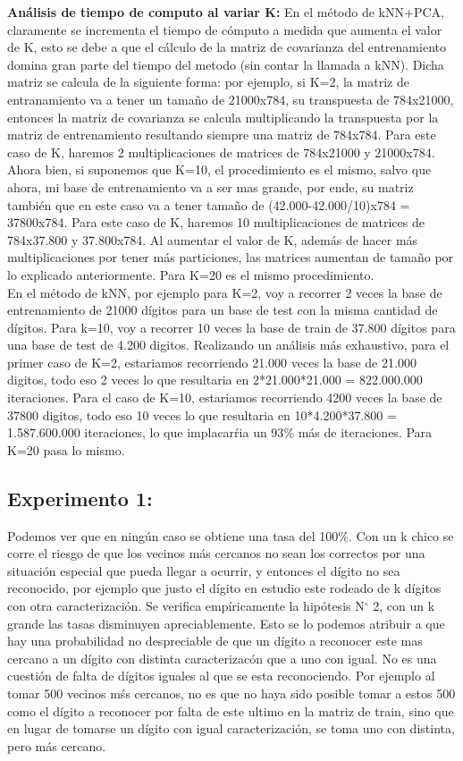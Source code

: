 \textbf{Análisis de tiempo de computo al variar K:}
 En el método de kNN+PCA, claramente se incrementa el tiempo de cómputo a medida que aumenta el valor de K, esto se debe a que el cálculo de la matriz de covarianza del entrenamiento domina gran parte del tiempo del metodo (sin contar la llamada a kNN). Dicha matriz se calcula de la siguiente forma: por ejemplo, si K=2, la matriz de entranamiento va a tener un tamaño de 21000x784, su transpuesta de 784x21000, entonces la matriz de covarianza se calcula multiplicando la transpuesta por la matriz de entrenamiento resultando siempre una matriz de 784x784. Para este caso de K, haremos 2 multiplicaciones de matrices de 784x21000 y 21000x784. Ahora bien, si suponemos que K=10, el procedimiento es el mismo, salvo que ahora, mi base de entrenamiento va a ser mas grande, por ende, su matriz también que en este caso va a tener tamaño de (42.000-42.000/10)x784 = 37800x784. Para este caso de K, haremos 10 multiplicaciones de matrices de 784x37.800 y 37.800x784. Al aumentar el valor de K, además de hacer más multiplicaciones por tener más particiones, las matrices aumentan de tamaño por lo explicado anteriormente. Para K=20 es el mismo procedimiento.\\
En el método de kNN, por ejemplo para K=2, voy a recorrer 2 veces la base de entrenamiento de 21000 dígitos para un base de test con la misma cantidad de dígitos. Para k=10, voy a recorrer 10 veces la base de train de 37.800 dígitos para una base de test de 4.200 digitos. Realizando un análisis más exhaustivo, para el primer caso de K=2, estariamos recorriendo 21.000 veces la base de 21.000 digitos, todo eso 2 veces lo que resultaria en 2*21.000*21.000 = 822.000.000 iteraciones. Para el caso de K=10, estariamos recorriendo 4200 veces la base de 37800 digitos, todo eso 10 veces lo que resultaria en 10*4.200*37.800 = 1.587.600.000 iteraciones, lo que implacarŕia un 93$\%$ más de iteraciones. Para K=20 pasa lo mismo.\\

 \subsection{Experimento 1:}

Podemos ver que en ningún caso se obtiene una tasa del 100$ \% $. Con un k chico se corre el riesgo de que los vecinos más cercanos no sean los correctos por una situación especial que pueda llegar a ocurrir, y entonces el dígito no sea reconocido, por ejemplo que justo el dígito en estudio este rodeado de k dígitos con otra caracterización. Se verifica empíricamente la hipótesis N$ ^{\circ} $ 2, con un k grande las tasas disminuyen apreciablemente. Esto se lo podemos atribuir a que hay una probabilidad no despreciable de que un dígito a reconocer este mas cercano a un dígito con distinta caracterizacón que a uno con igual. No es una cuestión de falta de dígitos iguales al que se esta reconociendo. Por ejemplo al tomar 500 vecinos mśs cercanos, no es que no haya sido posible tomar a estos 500 como el dígito a reconocer por falta de este ultimo en la matriz de train, sino que en lugar de tomarse un dígito con igual caracterización, se toma uno con distinta, pero más cercano.

